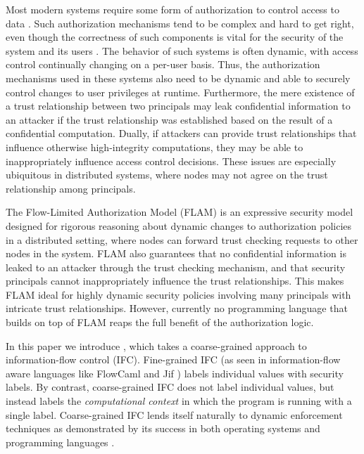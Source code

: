 Most modern systems require some form of authorization to control access to data \cite{Menezes:1996:HAC:548089}. Such authorization mechanisms tend to be complex and hard to get right, even though the correctness of such components is vital for the security of the system and its users \cite{Ferraiolo:1999:RAC:300830.300834}. 
The behavior of such systems is often dynamic, with access control continually changing on a per-user basis. Thus, the authorization mechanisms used in these systems also need to be dynamic and able to securely control changes to user privileges \cite{Ferraiolo:1999:RAC:300830.300834} at runtime. Furthermore, the mere existence of a trust relationship between two principals may leak confidential information to an attacker if the trust relationship was established based on the result of a confidential computation. Dually, if attackers can provide trust relationships that influence otherwise high-integrity computations, they may be able to inappropriately influence access control decisions. These issues are especially ubiquitous in distributed systems, where nodes may not agree on the trust relationship among principals.

The Flow-Limited Authorization Model (FLAM) \cite{Arden:2015:FA:2859845.2859998} is an expressive security model designed for rigorous reasoning about dynamic changes to authorization policies in a distributed setting, where nodes can forward trust checking requests to other nodes in the system. FLAM also guarantees that no confidential information is leaked to an attacker through the trust checking mechanism, and that security principals cannot inappropriately influence the trust relationships. This makes FLAM ideal for highly dynamic security policies involving many principals with intricate trust relationships. However, currently no programming language that builds on top of FLAM reaps the full benefit of the authorization logic.

In this paper we introduce \lang{}, which takes a coarse-grained approach to information-flow control (IFC). Fine-grained IFC (as seen in information-flow aware languages like FlowCaml \cite{Pottier:2003:IFI:596980.596983} and Jif \cite{Myers:1999:JPM:292540.292561}) labels individual values with security labels. By contrast, coarse-grained IFC does not label individual values, but instead labels the \emph{computational context} in which the program is running with a single label. Coarse-grained IFC lends itself naturally to dynamic enforcement techniques as demonstrated by its success in both operating systems \cite{Zeldovich:2006:MIF:1267308.1267327, Zeldovich:2008:SDS:1387589.1387610, Efstathopoulos:2005:LEP:1095810.1095813, Krohn:2007:IFC:1294261.1294293} and programming languages \cite{SRMMlio, Buiras:2015:HMS:2784731.2784758, Stefan:2012:ACT:2364527.2364557, Buiras:2015:DED:2786558.2786563}.

